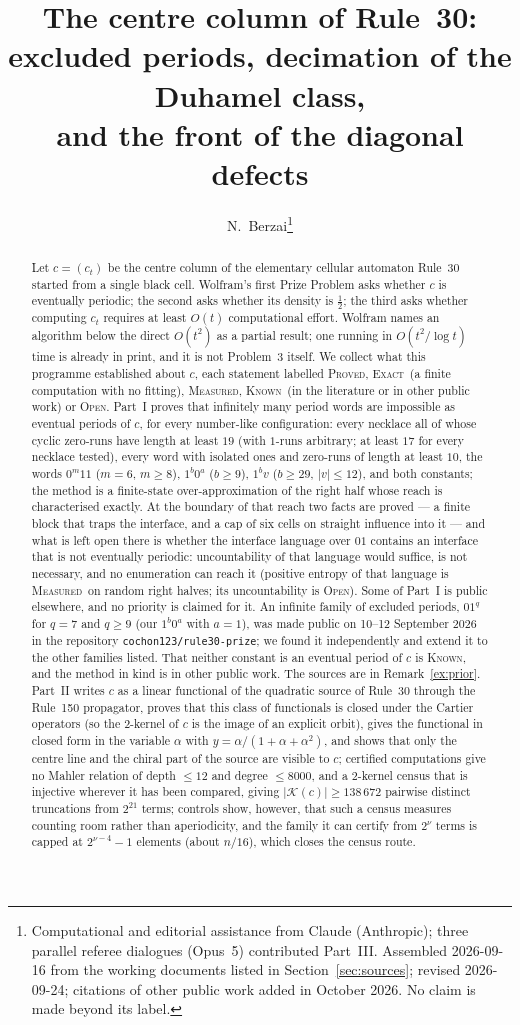\documentclass[11pt]{article}
\title{The centre column of Rule~30:\\ excluded periods, decimation of the Duhamel class,\\ and the front of the diagonal defects}
\author{N.~Berzai\thanks{Computational and editorial assistance from Claude (Anthropic); three parallel referee dialogues (Opus~5) contributed Part~III. Assembled 2026-09-16 from the working documents listed in Section~\ref{sec:sources}; revised 2026-09-24; citations of other public work added in October 2026. No claim is made beyond its label.}}
\date{}
\theoremstyle{definition}
\theoremstyle{remark}
\newcommand{\PROVED}{\textsc{Proved}}
\newcommand{\EXACT}{\textsc{Exact}}
\newcommand{\MEASURED}{\textsc{Measured}}
\newcommand{\KNOWN}{\textsc{Known}}
\newcommand{\OPEN}{\textsc{Open}}
\begin{document}
\maketitle

\begin{abstract}
Let $c=(c_t)$ be the centre column of the elementary cellular automaton Rule~30 started from a single black cell. Wolfram's first Prize Problem asks whether $c$ is eventually periodic; the second asks whether its density is $\tfrac12$; the third asks whether computing $c_t$ requires at least $O(t)$ computational effort. Wolfram names an algorithm below the direct $O(t^{2})$ as a partial result; one running in $O(t^{2}/\log t)$ time is already in print, and it is not Problem~3 itself. We collect what this programme established about $c$, each statement labelled \PROVED, \EXACT\ (a finite computation with no fitting), \MEASURED, \KNOWN\ (in the literature or in other public work) or \OPEN.
Part~I proves that infinitely many period words are impossible as eventual periods of $c$, for every number-like configuration: every necklace all of whose cyclic zero-runs have length at least $19$ (with $1$-runs arbitrary; at least $17$ for every necklace tested), every word with isolated ones and zero-runs of length at least $10$, the words $0^m11$ ($m=6$, $m\ge8$), $1^b0^a$ ($b\ge9$), $1^bv$ ($b\ge29$, $|v|\le12$), and both constants; the method is a finite-state over-approximation of the right half whose reach is characterised exactly. At the boundary of that reach two facts are proved --- a finite block that traps the interface, and a cap of six cells on straight influence into it --- and what is left open there is whether the interface language over $01$ contains an interface that is not eventually periodic: uncountability of that language would suffice, is not necessary, and no enumeration can reach it (positive entropy of that language is \MEASURED\ on random right halves; its uncountability is \OPEN). Some of Part~I is public elsewhere, and no priority is claimed for it. An infinite family of excluded periods, $01^{q}$ for $q=7$ and $q\ge9$ (our $1^b0^a$ with $a=1$), was made public on 10--12 September 2026 in the repository \texttt{cochon123/rule30-prize}; we found it independently and extend it to the other families listed. That neither constant is an eventual period of $c$ is \KNOWN, and the method in kind is in other public work. The sources are in Remark~\ref{ex:prior}.
Part~II writes $c$ as a linear functional of the quadratic source of Rule~30 through the Rule~150 propagator, proves that this class of functionals is closed under the Cartier operators (so the $2$-kernel of $c$ is the image of an explicit orbit), gives the functional in closed form in the variable $\alpha$ with $y=\alpha/(1+\alpha+\alpha^2)$, and shows that only the centre line and the chiral part of the source are visible to $c$; certified computations give no Mahler relation of depth $\le12$ and degree $\le8000$, and a $2$-kernel census that is injective wherever it has been compared, giving $|\mathcal K(c)|\ge138\,672$ pairwise distinct truncations from $2^{21}$ terms; controls show, however, that such a census measures counting room rather than aperiodicity, and the family it can certify from $2^{\nu}$ terms is capped at $2^{\nu-4}-1$ elements (about $n/16$), which closes the census route.

\end{abstract}
\end{document}
